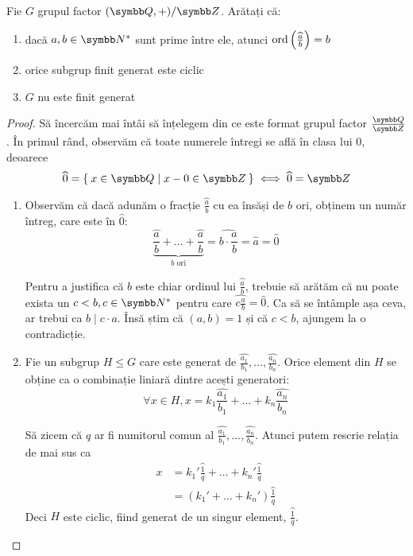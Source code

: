 \begin{exercise}
Fie \(G\) grupul factor \((\rationals, +) / \integers\). Arătați că:

\begin{enumerate}
    \item dacă \(a, b \in \naturals^*\) sunt prime între ele, atunci \(\operatorname{ord}\left(\widehat{\frac{a}{b}}\right) = b\)
    \item orice subgrup finit generat este ciclic
    \item \(G\) nu este finit generat
\end{enumerate}
\end{exercise}
\begin{proof}
Să încercăm mai întâi să înțelegem din ce este format grupul factor \(\frac{\rationals}{\integers}\). În primul rând, observăm că toate numerele întregi se află în clasa lui 0, deoarece
\[
    \widehat{0} = \Set{ x \in \rationals | x - 0 \in \integers } \iff \widehat{0} = \integers
\]

\begin{enumerate}
    \item Observăm că dacă adunăm o fracție \(\widehat{\frac{a}{b}}\) cu ea însăși de \(b\) ori, obținem un număr întreg, care este în \(\widehat{0}\):
    \[
        \underbrace{\widehat{\frac{a}{b}} + \dots + \widehat{\frac{a}{b}}}_{b \text{ ori}} = \widehat{b \cdot \frac{a}{b}} = \widehat{a} = \widehat{0}
    \]
    
    Pentru a justifica că \(b\) este chiar ordinul lui \(\widehat{\frac{a}{b}}\), trebuie să arătăm că nu poate exista un \(c < b, c \in \naturals^*\) pentru care \(\widehat{c \frac{a}{b}} = \widehat{0}\). Ca să se întâmple așa ceva, ar trebui ca \(b \mid c \cdot a\). Însă știm că \((a, b) = 1\) și că \(c < b\), ajungem la o contradicție.
    
    \item Fie un subgrup \(H \leq G\) care este generat de \(\widehat{\frac{a_1}{b_1}}, \dots, \widehat{\frac{a_n}{b_n}}\).
    Orice element din \(H\) se obține ca o combinație liniară dintre acești generatori:
    \[
        \forall x \in H, x = k_1 \widehat{\frac{a_1}{b_1}} + \dots + k_n \widehat{\frac{a_n}{b_n}}
    \]
    
    Să zicem că \(q\) ar fi numitorul comun al  \(\widehat{\frac{a_1}{b_1}}, \dots, \widehat{\frac{a_n}{b_n}}\). Atunci putem rescrie relația de mai sus ca
    \begin{align*}
        x &= k_1' \widehat{\frac{1}{q}} + \dots + k_n' \widehat{\frac{1}{q}} \\
        &= (k_1' + \dots + k_n') \widehat{\frac{1}{q}}
    \end{align*}
    Deci \(H\) este ciclic, fiind generat de un singur element, \(\widehat{\frac{1}{q}}\).
    

\end{enumerate}
\end{proof}
